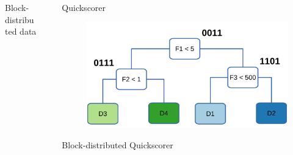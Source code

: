 \documentclass[final]{beamer}
\newlength{\sepwid}
\newlength{\onecolwid}
\begin{document}
\begin{frame}[t]
\begin{columns}[t]
\begin{column}{\onecolwid}
\begin{block}{Block-distributed data}
	
\end{block}





\end{column} %

\begin{column}{\sepwid}\end{column} %

\begin{column}{\onecolwid} %
	
	
	
	\begin{block}{Quickscorer}
		
		\begin{figure}
			\includegraphics[width=\onecolwid]{decision_tree_bitstrings}
			\label{fig:quickscorer}
		\end{figure}
		
	\end{block}

	\begin{block}{Block-distributed Quickscorer}
		

\end{block}
\end{column}
\end{columns}
\end{frame}
\end{document}
